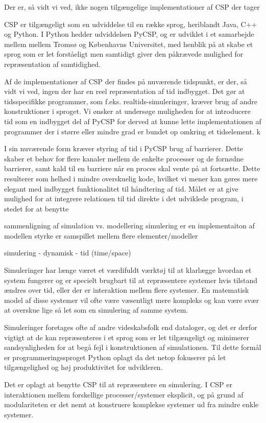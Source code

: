 Der er, så vidt vi ved, ikke nogen tilgængelige implementationer af CSP der 
tager 

CSP er tilgængeligt som en udviddelse til en række sprog, heriblandt Java, C++ 
og Python. I Python hedder udviddelsen PyCSP, og er udviklet i et samarbejde 
mellem mellem Tromsø og Københavns Universitet, med henblik på at skabe et 
sprog som er let forståeligt men samtidigt giver den påkrævede mulighed for 
repræsentation af samtidighed.  


Af de implementationer af CSP der findes på nuværende tidspunkt, er der, så 
vidt vi ved, ingen der har en reel repræsentation af tid indbygget. Det gør at 
tidsspecifikke programmer, som f.eks. realtids-simuleringer, kræver brug af 
andre konstruktioner i sproget.
Vi ønsker at undersøge muligheden for at introducere tid som en indbygget del 
af PyCSP for derved at kunne lette implementationen af programmer der i større 
eller mindre grad er bundet op omkring et tidselement. k


I sin nuværende form kræver styring af tid i PyCSP brug af 
barrierer. Dette skaber et 
behov for flere kanaler mellem de enkelte processer og de fornødne barrierer, 
samt kald til en barriere når en proces skal vente på at fortsætte.  Dette 
resulterer som helhed i mindre overskuelig kode, hvilket vi mener kan gøres 
mere elegant med indbygget funktionalitet til håndtering af tid. Målet er at 
give mulighed for at integrere relationen til tid direkte i det udviklede 
program, i stedet for at benytte 


sammenligning af simulation vs. modellering
  simulering er en implementaiton af modellen
  styrke er samspillet mellem flere elementer/modeller


simulering - dynamisk - tid (time/space)

Simuleringer har længe været et værdifuldt værktøj til at klarlægge hvordan et 
system fungerer og er specielt brugbart til at repræsentere systemer hvis 
tilstand ændres over tid, eller der er interaktion mellem flere systemer. En 
matematisk model af disse systemer vil ofte være væsentligt mere kompleks og 
kan være svær at overskue lige så let som en simulering af samme system. 

Simuleringer foretages ofte af andre videskabsfolk end dataloger, og det er 
derfor vigtigt at de kan repræsenteres i et sprog som er let tilgængeligt og 
minimerer sandsynligheden for at begå fejl i konstruktionen af simulationen.  
Til dette formål er programmeringssproget Python oplagt da det netop fokuserer 
på let tilgængelighed og høj produktivitet for udvikleren. 

Det er oplagt at benytte CSP\cite{hoare-csp} til at repræsentere en simulering.  
I CSP er interaktionen mellem forskellige processer/systemer eksplicit, og på 
grund af modulariteten er det nemt at konstruere komplekse systemer ud fra 
mindre enkle systemer. 

